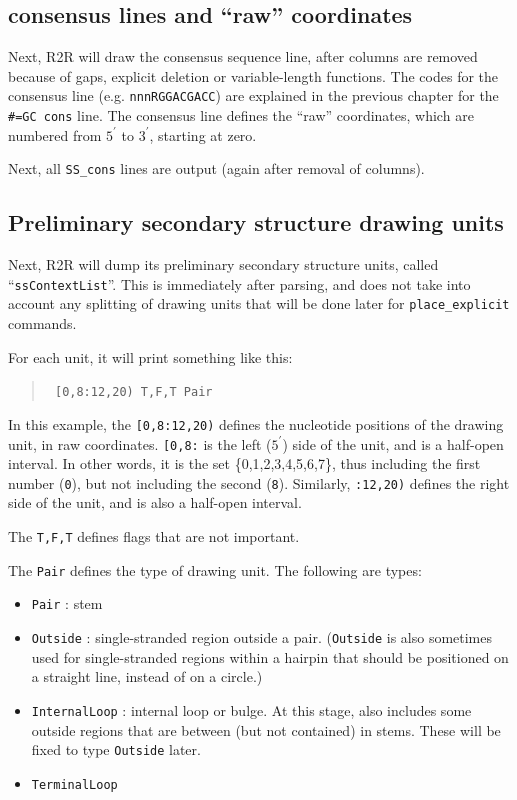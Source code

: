 \documentclass[letterpaper,12pt]{report}
\newcommand{\example}[1]{
\begin{quote}
{\raggedright
#1
}
\end{quote}
}
\newcommand{\examplett}[1]{
\example{{\tt #1}}
}
\begin{document}
\subsection{consensus lines and ``raw'' coordinates}

Next, R2R will draw the consensus sequence line, after columns are removed
because of gaps, explicit deletion or variable-length functions.
The codes for the consensus line (e.g. {\tt nnnRGGACGACC}) are explained
in the previous chapter for the {\tt \#=GC cons} line.
The consensus line defines the ``raw'' coordinates, which are numbered from
$5^\prime$ to $3^\prime$, starting at zero.

Next, all {\tt SS\_cons} lines are output (again after removal of columns).

\subsection{Preliminary secondary structure drawing units}

Next, R2R will dump its preliminary secondary structure units, called
``{\tt ssContextList}''.
This is immediately after parsing, and does not take into account any splitting
of drawing units that will be done later for {\tt place\_explicit} commands.

For each unit, it will print something like this:
\examplett{
[0,8:12,20) T,F,T Pair
}
In this example, the {\tt [0,8:12,20)} defines the nucleotide positions 
of the drawing unit, in raw coordinates.
{\tt [0,8:} is the left ($5^\prime$) side of the unit, and is a half-open interval.
In other words, it is the set \{0,1,2,3,4,5,6,7\}, thus including the first
number ({\tt 0}), but not including the second ({\tt 8}).
Similarly, {\tt :12,20)} defines the right side of the unit, and is also
a half-open interval.

The {\tt T,F,T} defines flags that are not important.

The {\tt Pair} defines the type of drawing unit.  The following are types:
\begin{itemize}
\item {\tt Pair} : stem
\item {\tt Outside} : single-stranded region outside a pair.  ({\tt Outside} is also
sometimes used for single-stranded regions within a hairpin that should be positioned
on a straight line, instead of on a circle.)
\item {\tt InternalLoop} : internal loop or bulge.  At this stage, also includes some outside
regions that are between (but not contained) in stems.  These will be fixed to type {\tt Outside}
later.
\item {\tt TerminalLoop}
\end{itemize}
\end{document}
